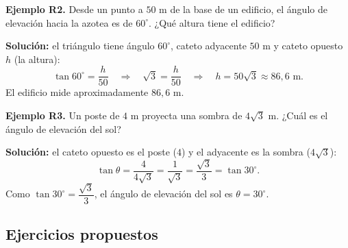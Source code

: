 \documentclass[12pt, letterpaper]{article}
\begin{document}
\textbf{Ejemplo R2.} Desde un punto a $50$ m de la base de un edificio, el ángulo de elevación hacia la azotea es de $60^{\circ}$. ¿Qué altura tiene el edificio?

\begin{cuadrosolucion}
  \textbf{Solución:} el triángulo tiene ángulo $60^{\circ}$, cateto adyacente $50$ m y cateto opuesto $h$ (la altura):
  $$\tan 60^{\circ} = \frac{h}{50} \quad \Rightarrow \quad \sqrt{3} = \frac{h}{50} \quad \Rightarrow \quad h = 50\sqrt{3} \approx 86{,}6 \text{ m}.$$
  El edificio mide aproximadamente $86{,}6$ m.
\end{cuadrosolucion}

\textbf{Ejemplo R3.} Un poste de $4$ m proyecta una sombra de $4\sqrt{3}$ m. ¿Cuál es el ángulo de elevación del sol?

\begin{cuadrosolucion}
  \textbf{Solución:} el cateto opuesto es el poste ($4$) y el adyacente es la sombra ($4\sqrt{3}$):
  $$\tan \theta = \frac{4}{4\sqrt{3}} = \frac{1}{\sqrt{3}} = \frac{\sqrt{3}}{3} = \tan 30^{\circ}.$$
  Como $\tan 30^{\circ} = \dfrac{\sqrt{3}}{3}$, el ángulo de elevación del sol es $\theta = 30^{\circ}$.
\end{cuadrosolucion}

\newpage %

\subsection{Ejercicios propuestos}
\end{document}
